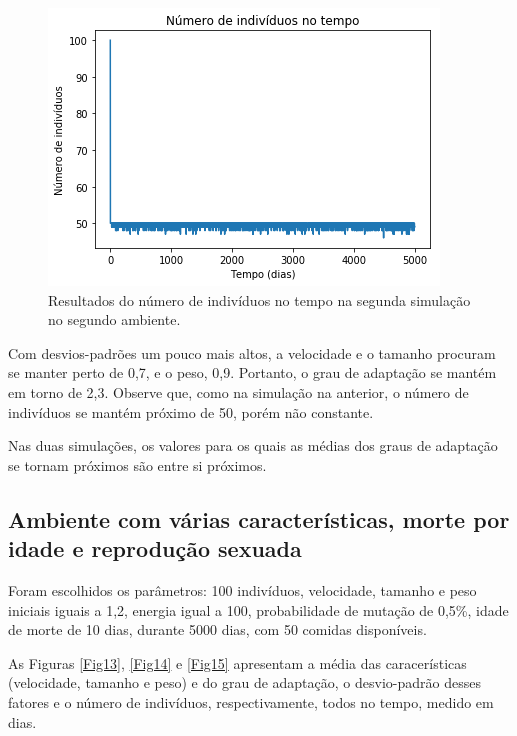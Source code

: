 \documentclass[10pt,brazil,english]{article}
\begin{document}
        \begin{figure}[!hbtp]
            \begin{center}
                \includegraphics[scale=0.5]{Images/2-6.png}
            \end{center}
            \caption{Resultados do número de indivíduos no tempo na segunda simulação no segundo ambiente.}
            \label{Fig12}
        \end{figure}
        
        Com desvios-padrões um pouco mais altos, a velocidade e o tamanho procuram se manter perto de 0,7, e o peso, 0,9. Portanto, o grau de adaptação se mantém em torno de 2,3. Observe que, como na simulação na anterior, o número de indivíduos se mantém próximo de 50, porém não constante.
        
        Nas duas simulações, os valores para os quais as médias dos graus de adaptação se tornam próximos são entre si próximos.
        
        \subsection{Ambiente com várias características, morte por idade e reprodução sexuada}
        
        Foram escolhidos os parâmetros: 100 indivíduos, velocidade, tamanho e peso iniciais iguais a 1,2, energia igual a 100, probabilidade de mutação de 0,5\%, idade de morte de 10 dias, durante  5000 dias, com 50 comidas disponíveis.
        
        As Figuras \ref{Fig13}, \ref{Fig14} e \ref{Fig15} apresentam a média das caracerísticas (velocidade, tamanho e peso) e do grau de adaptação, o desvio-padrão desses fatores e o número de indivíduos, respectivamente, todos no tempo, medido em dias.
        
\end{document}
